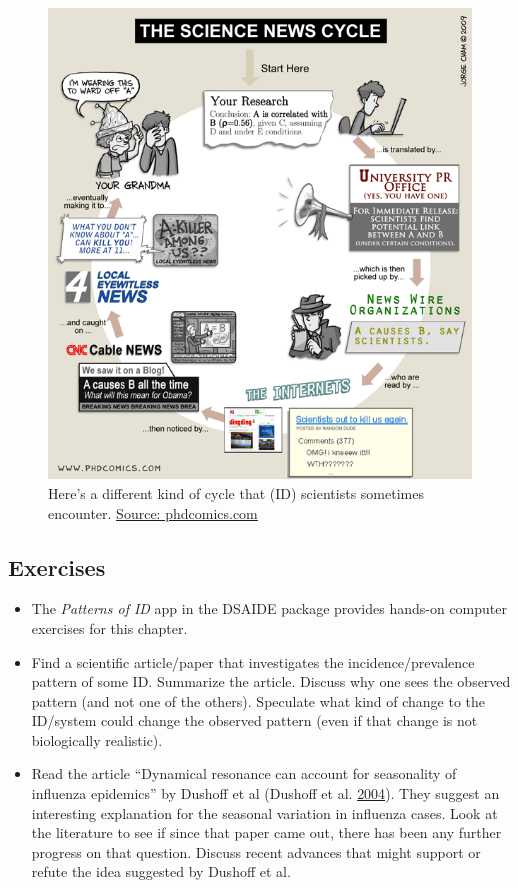 \documentclass[]{article}
\providecommand{\tightlist}{%
  \setlength{\itemsep}{0pt}\setlength{\parskip}{0pt}}
\theoremstyle{definition}
\theoremstyle{definition}
\theoremstyle{definition}
\theoremstyle{remark}
\begin{document}
\begin{figure}
\centering
\includegraphics{./images/phd_sciencenewscycle.gif}
\caption{Here's a different kind of cycle that (ID) scientists sometimes
encounter.
\href{http://www.phdcomics.com/comics/archive.php?comicid=1174}{Source:
phdcomics.com}}
\end{figure}

\subsection{Exercises}\label{exercises-2}

\begin{itemize}
\tightlist
\item
  The \emph{Patterns of ID} app in the DSAIDE package provides hands-on
  computer exercises for this chapter.
\item
  Find a scientific article/paper that investigates the
  incidence/prevalence pattern of some ID. Summarize the article.
  Discuss why one sees the observed pattern (and not one of the others).
  Speculate what kind of change to the ID/system could change the
  observed pattern (even if that change is not biologically realistic).
\item
  Read the article ``Dynamical resonance can account for seasonality of
  influenza epidemics'' by Dushoff et al (Dushoff et al.
  \protect\hyperlink{ref-dushoff04}{2004}). They suggest an interesting
  explanation for the seasonal variation in influenza cases. Look at the
  literature to see if since that paper came out, there has been any
  further progress on that question. Discuss recent advances that might
  support or refute the idea suggested by Dushoff et al.
\end{itemize}
\end{document}
